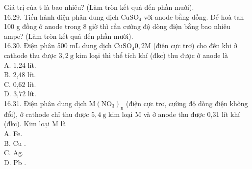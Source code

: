 \documentclass[10pt]{article}
\begin{document}
Giá trị của t là bao nhiêu? (Làm tròn kết quả đến phần muời).\\
16.29. Tiến hành điện phân dung dịch $\mathrm{CuSO}_{4}$ với anode bằng đồng. Để hoà tan 100 g đồng ở anode trong 8 giờ thì cần cường độ dòng điện bằng bao nhiêu ampe? (Làm tròn kết quả đến phần mười).\\
16.30. Điện phân 500 mL dung dịch $\mathrm{CuSO}_{4} 0,2 \mathrm{M}$ (điện cực trơ) cho đến khi ở cathode thu được $3,2 \mathrm{~g}$ kim loại thì thể tích khí (đkc) thu được ở anode là\\
A. 1,24 lít.\\
B. 2,48 lít.\\
C. 0,62 lít.\\
D. 3,72 lít.\\
16.31. Điện phân dung dịch $\mathrm{M}\left(\mathrm{NO}_{3}\right)_{\mathrm{n}}$ (điện cực trơ, cường độ dòng điện không đổi), ở cathode chỉ thu được $5,4 \mathrm{~g}$ kim loại M và ở anode thu được 0,31 lít khí (đkc). Kim loại M là\\
A. Fe.\\
B. Cu .\\
C. Ag.\\
D. Pb .
\end{document}
